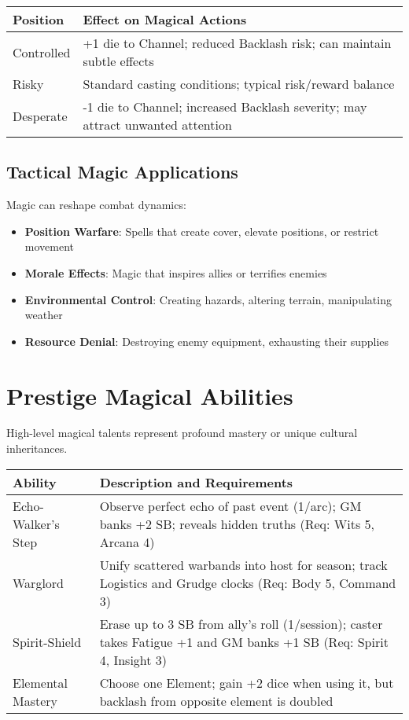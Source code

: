 \begin{fatebox}
\begin{tabularx}{\textwidth}{lX}
\toprule
\textbf{Position} & \textbf{Effect on Magical Actions} \\
\midrule
Controlled & +1 die to Channel; reduced Backlash risk; can maintain subtle effects \\
Risky & Standard casting conditions; typical risk/reward balance \\
Desperate & -1 die to Channel; increased Backlash severity; may attract unwanted attention \\
\bottomrule
\end{tabularx}
\end{fatebox}

\subsection*{Tactical Magic Applications}

Magic can reshape combat dynamics:
\begin{itemize}
    \item \textbf{Position Warfare}: Spells that create cover, elevate positions, or restrict movement
    \item \textbf{Morale Effects}: Magic that inspires allies or terrifies enemies
    \item \textbf{Environmental Control}: Creating hazards, altering terrain, manipulating weather
    \item \textbf{Resource Denial}: Destroying enemy equipment, exhausting their supplies
\end{itemize}

\section*{Prestige Magical Abilities}

High-level magical talents represent profound mastery or unique cultural inheritances.

\begin{fatebox}
\begin{tabularx}{\textwidth}{lX}
\toprule
\textbf{Ability} & \textbf{Description and Requirements} \\
\midrule
Echo-Walker's Step & Observe perfect echo of past event (1/arc); GM banks +2 SB; reveals hidden truths (Req: Wits 5, Arcana 4) \\
Warglord & Unify scattered warbands into host for season; track Logistics and Grudge clocks (Req: Body 5, Command 3) \\
Spirit-Shield & Erase up to 3 SB from ally's roll (1/session); caster takes Fatigue +1 and GM banks +1 SB (Req: Spirit 4, Insight 3) \\
Elemental Mastery & Choose one Element; gain +2 dice when using it, but backlash from opposite element is doubled \\
\bottomrule
\end{tabularx}
\end{fatebox}


